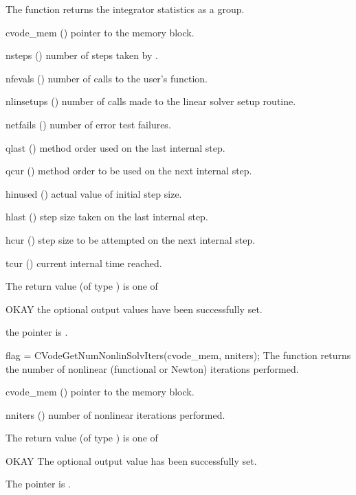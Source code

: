 {
  The function  returns the {\cvode} integrator statistics
  as a group.
}
{
  \begin{args}
  \item[cvode\_mem] ()
    pointer to the {\cvode} memory block.
  \item[nsteps] ()
    number of steps taken by {\cvode}.
  \item[nfevals] ()
    number of calls to the user's  function.
  \item[nlinsetups] ()
    number of calls made to the linear solver setup routine.
  \item[netfails] ()
    number of error test failures.
  \item[qlast] ()
    method order used on the last internal step.
  \item[qcur] ()
    method order to be used on the next internal step.
  \item[hinused] ()
    actual value of initial step size.
  \item[hlast] ()
    step size taken on the last internal step.
  \item[hcur] ()
    step size to be attempted on the next internal step.
  \item[tcur] ()
    current internal time reached.
  \end{args}
}
{
  The return value  (of type ) is one of
  \begin{args}
  \item[OKAY] 
    the optional output values have been successfully set.
  \item[\Id{CVG\_NO\_MEM}]
    the  pointer is .
  \end{args}
}
{}
{
  flag = CVodeGetNumNonlinSolvIters(cvode\_mem, nniters);
}
{
  The function  returns the
  number of nonlinear (functional or Newton) iterations performed. 
}
{
  \begin{args}
  \item[cvode\_mem] ()
    pointer to the {\cvode} memory block.
  \item[nniters] ()
    number of nonlinear iterations performed.
  \end{args}
}
{
  The return value  (of type ) is one of
  \begin{args}
  \item[OKAY] 
    The optional output value has been successfully set.
  \item[\Id{CVG\_NO\_MEM}]
    The  pointer is .
  \end{args}
}
